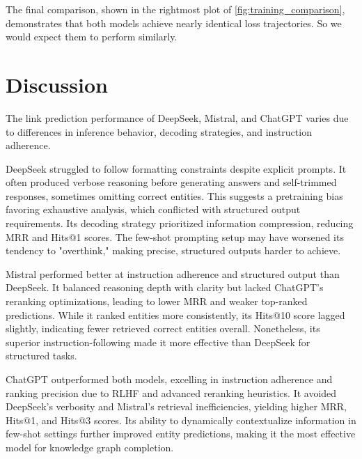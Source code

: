 \documentclass[12pt,a4paper]{article}
\begin{document}
The final comparison, shown in the rightmost plot of \cref{fig:training_comparison}, demonstrates that both models achieve nearly identical loss trajectories.
So we would expect them to perform similarly.




%
%

\section{Discussion}\label{sec:discussion}


The link prediction performance of DeepSeek, Mistral, and ChatGPT varies due to differences in inference behavior, decoding strategies, and instruction adherence.

DeepSeek struggled to follow formatting constraints despite explicit prompts. It often produced verbose reasoning before generating answers and self-trimmed responses, sometimes omitting correct entities. This suggests a pretraining bias favoring exhaustive analysis, which conflicted with structured output requirements. Its decoding strategy prioritized information compression, reducing MRR and Hits@1 scores. The few-shot prompting setup may have worsened its tendency to "overthink," making precise, structured outputs harder to achieve.

Mistral performed better at instruction adherence and structured output than DeepSeek. It balanced reasoning depth with clarity but lacked ChatGPT’s reranking optimizations, leading to lower MRR and weaker top-ranked predictions. While it ranked entities more consistently, its Hits@10 score lagged slightly, indicating fewer retrieved correct entities overall. Nonetheless, its superior instruction-following made it more effective than DeepSeek for structured tasks.

ChatGPT outperformed both models, excelling in instruction adherence and ranking precision due to RLHF and advanced reranking heuristics. It avoided DeepSeek’s verbosity and Mistral’s retrieval inefficiencies, yielding higher MRR, Hits@1, and Hits@3 scores. Its ability to dynamically contextualize information in few-shot settings further improved entity predictions, making it the most effective model for knowledge graph completion.
\end{document}
